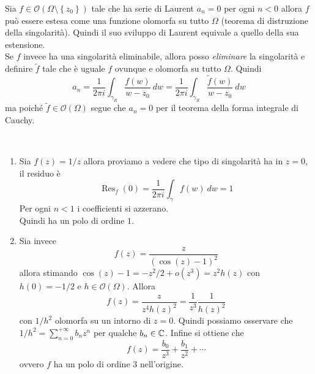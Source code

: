 \begin{remark}
  Sia $f \in \mathcal{O}(\Omega \setminus \left\{ z_0 \right\})$ tale che ha serie di 
  Laurent $a_n = 0$ per ogni $n < 0$  allora $f$ può essere estesa come una 
  funzione olomorfa su tutto $\Omega$ (teorema di distruzione della singolarità).
  Quindi il suo sviluppo di Laurent equivale a quello della sua estensione.\\
  
  Se $f$ invece ha una singolarità eliminabile, allora posso \emph{eliminare} la
  singolarità e definire $\tilde{f}$ tale che è uguale $f$ ovunque e olomorfa su
  tutto $\Omega$. Quindi 
  \begin{equation*}
    a_n = \frac{1}{2\pi i} \int_{\gamma_R} \frac{f(w)}{w-z_0}\ dw 
        = \frac{1}{2\pi i} \int_{\gamma_R} \frac{\tilde{f}(w)}{w-z_0}\ dw
  \end{equation*}
  ma poiché $\tilde{f} \in \mathcal{O}(\Omega)$ segue che $a_n = 0$ per il teorema
  della forma integrale di Cauchy.
  \label{rmk:equivalenza_definizioni_sing_eliminabili}
\end{remark}

\begin{example}\
  \begin{enumerate}
    \item Sia $f(z) = 1/z$ allora proviamo a vedere che tipo di singolarità ha
      in $z = 0$, il residuo è 
      \begin{equation*}
        \operatorname{Res}_f(0) = \frac{1}{2\pi i } \int_{\gamma} f(w)\ dw = 1
      \end{equation*}
      Per ogni $n < 1$ i coefficienti si azzerano.\\ Quindi ha un polo di ordine
      $1$.
    \item Sia invece 
      \begin{equation*}
        f(z) = \frac{z}{(\cos(z) - 1)^2}
      \end{equation*}
      allora stimando $\cos(z) - 1 = -z^2/2 + o(z^3) = z^2 h(z)$ con $h(0)
      = -1/2$ e $h \in \mathcal{O}(\Omega)$. Allora 
      \begin{equation*}
        f(z) = \frac{z}{z^4h(z)^2} = \frac{1}{z^3} \frac{1}{h(z)^2}
      \end{equation*} 
      con $1/h^2$ olomorfa su un intorno di $z = 0$. Quindi possiamo osservare
      che $1/h^2 = \sum_{n=0}^{+\infty} b_n z^n$ per qualche $b_n \in \mathbb{C}$.
      Infine si ottiene che 
      \begin{equation*}
        f(z) = \frac{b_0}{z^3} + \frac{b_1}{z^2} + \cdots
      \end{equation*}
      ovvero $f$ ha un polo di ordine $3$ nell'origine.
  \end{enumerate}
\end{example}


